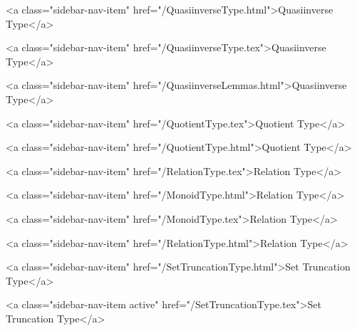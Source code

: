       
    
      
        
          <a class="sidebar-nav-item" href="/QuasiinverseType.html">Quasiinverse Type</a>
        
      
    
      
        
          <a class="sidebar-nav-item" href="/QuasiinverseType.tex">Quasiinverse Type</a>
        
      
    
      
        
          <a class="sidebar-nav-item" href="/QuasiinverseLemmas.html">Quasiinverse Type</a>
        
      
    
      
        
          <a class="sidebar-nav-item" href="/QuotientType.tex">Quotient Type</a>
        
      
    
      
        
          <a class="sidebar-nav-item" href="/QuotientType.html">Quotient Type</a>
        
      
    
      
        
          <a class="sidebar-nav-item" href="/RelationType.tex">Relation Type</a>
        
      
    
      
        
          <a class="sidebar-nav-item" href="/MonoidType.html">Relation Type</a>
        
      
    
      
        
          <a class="sidebar-nav-item" href="/MonoidType.tex">Relation Type</a>
        
      
    
      
        
          <a class="sidebar-nav-item" href="/RelationType.html">Relation Type</a>
        
      
    
      
        
          <a class="sidebar-nav-item" href="/SetTruncationType.html">Set Truncation Type</a>
        
      
    
      
        
          <a class="sidebar-nav-item active" href="/SetTruncationType.tex">Set Truncation Type</a>
        
